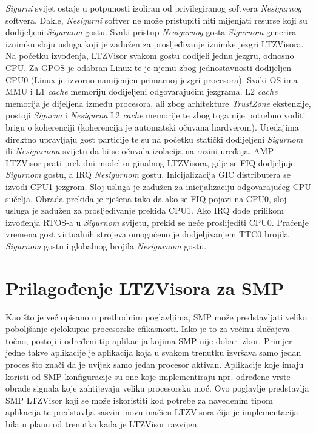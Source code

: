\documentclass[times, utf8, diplomski, numeric]{fer}
\begin{document}
\textit{Sigurni} svijet ostaje u potpunosti izoliran od privilegiranog softvera \textit{Nesigurnog} softvera. Dakle,
\textit{Nesigurni} softver ne može pristupiti niti mijenjati resurse koji su dodijeljeni \textit{Sigurnom} gostu. Svaki pristup
\textit{Nesigurnog} gosta \textit{Sigurnom} generira iznimku sloju usluga koji je zadužen za prosljeđivanje iznimke jezgri
LTZVisora.\\
Na početku izvođenja, LTZVisor svakom gostu dodijeli jednu jezgru, odnosno CPU. Za GPOS je odabran Linux te je njemu
zbog jednostavnosti dodijeljen CPU0 (Linux je izvorno namijenjen primarnoj jezgri procesora). Svaki OS ima MMU i L1
\textit{cache} memoriju dodijeljeni odgovarajućim jezgrama. L2 \textit{cache} memorija je dijeljena između procesora, ali zbog
arhitekture \textit{TrustZone} ekstenzije, postoji \textit{Sigurna} i \textit{Nesigurna} L2 \textit{cache} memorije te zbog
toga nije potrebno voditi brigu o koherenciji (koherencija je automatski očuvana hardverom). Uređajima direktno upravljaju gost
particije te su na početku statički dodijeljeni \textit{Sigurnom} ili \textit{Nesigurnom} svijetu da bi se očuvala izolacija
na razini uređaja. AMP LTZVisor prati prekidni model originalnog LTZVisora, gdje se FIQ dodjeljuje \textit{Sigurnom} gostu,
a IRQ \textit{Nesigurnom} gostu. Inicijalizacija GIC distributera se izvodi CPU1 jezgrom. Sloj usluga je zadužen za
inicijalizaciju odgovarajućeg CPU sučelja. Obrada prekida je rješena tako da ako se FIQ pojavi na CPU0, sloj usluga je zadužen
za prosljeđivanje prekida CPU1. Ako IRQ dođe prilikom izvođenja RTOS-a u \textit{Sigurnom} svijetu, prekid se neće proslijediti
CPU0. Praćenje vremena gost virtualnih strojeva omogućeno je dodjeljivanjem TTC0 brojila \textit{Sigurnom} gostu i globalnog
brojila \textit{Nesigurnom} gostu.

\section{Prilagođenje LTZVisora za SMP}
Kao što je već opisano u prethodnim poglavljima, SMP može predstavljati veliko poboljšanje cjelokupne procesorske efikasnosti.
Iako je to za većinu slučajeva točno, postoji i određeni tip aplikacija kojima SMP nije dobar izbor. Primjer jedne takve
aplikacije je aplikacija koja u svakom trenutku izvršava samo jedan proces što znači da je uvijek samo jedan procesor aktivan.
Aplikacije koje imaju koristi od SMP konfiguracije su one koje implementiraju npr. određene vrste obrade signala koje
zahtijevaju veliku procesorsku moć. Ovo poglavlje predstavlja SMP LTZVisor koji se može iskoristiti kod potrebe za navedenim
tipom aplikacija te predstavlja sasvim novu inačicu LTZVisora čija je implementacija bila u planu od trenutka kada je LTZVisor
razvijen.
\end{document}
